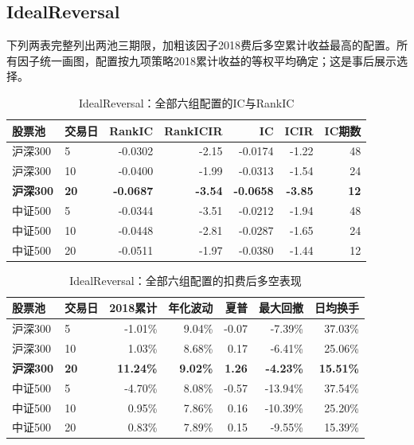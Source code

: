 \subsection{IdealReversal}
下列两表完整列出两池三期限，加粗该因子2018费后多空累计收益最高的配置。所有因子统一画图，配置按九项策略2018累计收益的等权平均确定；这是事后展示选择。
\begin{table}[H]\centering\normalsize\setlength{\tabcolsep}{3.5pt}
\caption{IdealReversal：全部六组配置的IC与RankIC}\begin{tabular}{llrrrrr}\toprule
股票池 & 交易日 & RankIC & RankICIR & IC & ICIR & IC期数\\\midrule
沪深300 & 5 & -0.0302 & -2.15 & -0.0174 & -1.22 & 48 \\
沪深300 & 10 & -0.0400 & -1.99 & -0.0313 & -1.54 & 24 \\
\textbf{沪深300} & \textbf{20} & \textbf{-0.0687} & \textbf{-3.54} & \textbf{-0.0658} & \textbf{-3.85} & \textbf{12} \\
中证500 & 5 & -0.0344 & -3.51 & -0.0212 & -1.94 & 48 \\
中证500 & 10 & -0.0448 & -2.81 & -0.0287 & -1.65 & 24 \\
中证500 & 20 & -0.0511 & -1.97 & -0.0380 & -1.44 & 12 \\
\bottomrule\end{tabular}\end{table}
\begin{table}[H]\centering\normalsize\setlength{\tabcolsep}{3.5pt}
\caption{IdealReversal：全部六组配置的扣费后多空表现}\begin{tabular}{llrrrrr}\toprule
股票池 & 交易日 & 2018累计 & 年化波动 & 夏普 & 最大回撤 & 日均换手\\\midrule
沪深300 & 5 & -1.01\% & 9.04\% & -0.07 & -7.39\% & 37.03\% \\
沪深300 & 10 & 1.03\% & 8.68\% & 0.17 & -6.41\% & 25.06\% \\
\textbf{沪深300} & \textbf{20} & \textbf{11.24\%} & \textbf{9.02\%} & \textbf{1.26} & \textbf{-4.23\%} & \textbf{15.51\%} \\
中证500 & 5 & -4.70\% & 8.08\% & -0.57 & -13.94\% & 37.54\% \\
中证500 & 10 & 0.95\% & 7.86\% & 0.16 & -10.39\% & 25.20\% \\
中证500 & 20 & 0.83\% & 7.89\% & 0.15 & -9.55\% & 15.39\% \\
\bottomrule\end{tabular}\end{table}
\clearpage
{}
\clearpage
